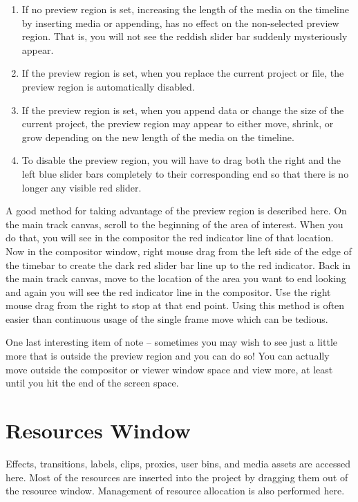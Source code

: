 \begin{enumerate}
    \item  If no preview region is set, increasing the length of the media on the timeline by inserting media or appending, has no effect on the non-selected preview region.  That is, you will not see the reddish slider bar suddenly mysteriously appear.
    \item  If the preview region is set, when you replace the current project or file,  the preview region is automatically disabled.
    \item  If the preview region is set, when you append data or change the size of the current project, the preview region may appear to either move, shrink, or grow depending on the new length of the media on the timeline.  
    \item  To disable the preview region, you will have to drag both the right and the left blue slider bars completely to their corresponding end so that there is no longer any visible red slider.
\end{enumerate}

A good method for taking advantage of the preview region is described here.  
On the main track canvas, scroll to the beginning of the area of interest.  
When you do that, you will see in the compositor the red indicator line of that location.  
Now in the compositor window, right mouse drag from the left side of the edge of the timebar to create the dark red slider bar line up to the red indicator.  
Back in the main track canvas, move to the location of the area you want to end looking and again you will see the red indicator line in the compositor.  
Use the right mouse drag from the right to stop at that end point.  Using this method is often easier than continuous usage of the single frame move which can be tedious.

One last interesting item of note -- sometimes you may wish to see just a little more that is outside the preview region and you can do so!  You can actually move outside the compositor or viewer window space and view more, at least until you hit the end of the screen space.

\section{Resources Window}%
\label{sec:resources_window}

Effects, transitions, labels, clips, proxies, user bins, and media assets are accessed here. 
Most of the resources are inserted into the project by dragging them out of the resource window. 
Management of resource allocation is also performed here.

